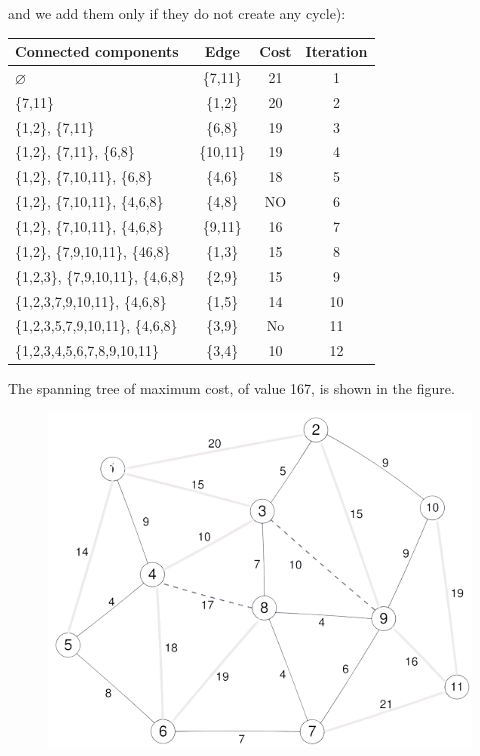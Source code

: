 \documentclass[12pt, a4paper]{report}
\begin{document}
\begin{enumerate}
                and we add them only if they do not create any cycle): 
                \begin{table}[H]
                    \centering
                    \begin{tabular}{lccc}
                    \hline
                    \textbf{Connected components}       & \textbf{Edge} & \textbf{Cost} & \textbf{Iteration} \\ \hline
                    $\varnothing$                       & \{7,11\}      & 21            & 1                  \\
                    \{7,11\}                            & \{1,2\}       & 20            & 2                  \\
                    \{1,2\}, \{7,11\}                   & \{6,8\}       & 19            & 3                  \\
                    \{1,2\}, \{7,11\}, \{6,8\}          & \{10,11\}     & 19            & 4                  \\
                    \{1,2\}, \{7,10,11\}, \{6,8\}       & \{4,6\}       & 18            & 5                  \\
                    \{1,2\}, \{7,10,11\}, \{4,6,8\}     & \{4,8\}       & NO            & 6                  \\
                    \{1,2\}, \{7,10,11\}, \{4,6,8\}     & \{9,11\}      & 16            & 7                  \\
                    \{1,2\}, \{7,9,10,11\}, \{46,8\}    & \{1,3\}       & 15            & 8                  \\
                    \{1,2,3\}, \{7,9,10,11\}, \{4,6,8\} & \{2,9\}       & 15            & 9                  \\
                    \{1,2,3,7,9,10,11\}, \{4,6,8\}      & \{1,5\}       & 14            & 10                 \\
                    \{1,2,3,5,7,9,10,11\}, \{4,6,8\}    & \{3,9\}       & No            & 11                 \\
                    \{1,2,3,4,5,6,7,8,9,10,11\}         & \{3,4\}       & 10            & 12                 \\ \hline
                    \end{tabular}
                \end{table}
                The spanning tree of maximum cost, of value 167, is shown in the figure. 
                \begin{figure}[H]
                    \centering
                    \includegraphics[width=0.4\linewidth]{images/kruskal.png}
                \end{figure}
        \end{enumerate}
\end{document}
